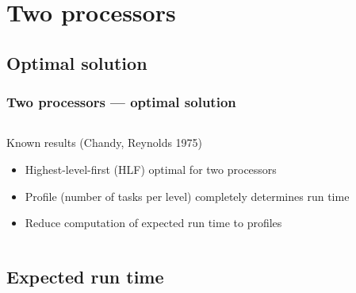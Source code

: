 \documentclass{beamer}
\newcommand{\profile}[1]{\left\llbracket #1 \right\rrbracket}
\begin{document}
\section{Two processors}

\subsection{Optimal solution}

\begin{frame}
  \frametitle{Two processors --- optimal solution}
  \begin{columns}
    \begin{column}{0.6\textwidth}
      \begin{block}{Known results (Chandy, Reynolds 1975)}
        \begin{itemize}
        \item Highest-level-first (HLF) optimal for two processors
        \item Profile (number of tasks per level) completely determines run time
        \item Reduce computation of expected run time to profiles
        \end{itemize}
      \end{block}
    \end{column}
    \begin{column}{.4\textwidth}
      
    \end{column}
  \end{columns}
\end{frame}

%     

\subsection{Expected run time}
\end{document}
